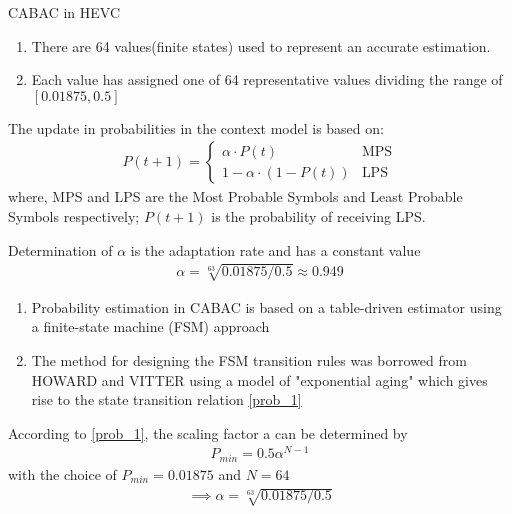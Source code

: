 \documentclass{beamer}
\begin{document}
\begin{frame}{CABAC in HEVC}
\begin{enumerate}[]
\item There are 64 values(finite states) used to represent an accurate estimation.
\item Each value has assigned one of 64 representative values dividing the range of $[0.01875,0.5]$
\end{enumerate}   
The update in probabilities in the context model is based on: 
\begin{align}
    P(t+1)=\label{prob_1}
    \begin{cases}
    \alpha\cdot P(t)&\text{MPS}\\
    1-\alpha\cdot(1-P(t))&\text{LPS}
    \end{cases}
\end{align}
where, MPS and LPS are the Most Probable Symbols and Least Probable Symbols respectively;
$P(t+1)$ is the probability of receiving LPS.
\end{frame}
\begin{frame}{Determination of \alpha }
     $\alpha$ is the adaptation rate and has a constant value
\begin{align}
    \alpha = \sqrt[63]{0.01875/0.5} \approx 0.949
\end{align}
\begin{enumerate}
    \item Probability estimation in CABAC is based on a table-driven estimator using a finite-state machine (FSM) approach
    \item The method for designing the FSM transition rules was borrowed from HOWARD and VITTER using a model of "exponential aging" which gives rise to the state transition relation \eqref{prob_1}\\
\end{enumerate}
    According to \eqref{prob_1}, the scaling factor a can be determined by 
    \begin{align}
        P_{min} = 0.5 \alpha^{N-1}
    \end{align}
    with the choice of $P_{min} = 0.01875$ and $N = 64$
    \begin{align}
    \implies\alpha = \sqrt[63]{0.01875/0.5} 
    \end{align}

\end{frame}
\end{document}
